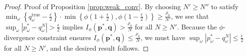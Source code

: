 \documentclass[opre,nonblindrev]{informs3} %
\newcommand{\q}{\mathbf{q}}
\newcommand{\p}{\mathbf{p}}
\newcommand{\qtrue}{\q^{\text{true}}}
\begin{document}
\begin{proof}{\sc Proof of Proposition \ref{prop:weak_conv}.}
	By choosing $N'\geq N''$ to satisfy $\min_{\omega} \left\{ q^{\text{true}}_\omega - \frac{\epsilon}{2} \right\} \cdot \min\left\{ \phi\left(1+\frac{\epsilon}{2}\right), \phi\left(1-\frac{\epsilon}{2}\right) \right\}\geq \frac{\rho_0}{N'}$, we see that $\sup_\omega |p_\omega^* - q^N_\omega| > \frac{\epsilon}{2}$ implies $I_\phi(\p^*,\q) > \frac{\rho_0}{N}$ for all $N \geq N'$. 
	Because the $\phi$-divergence constraint ensures $I_\phi(\p^*,\q) \leq \frac{\rho_0}{N}$, we must have $\sup_\omega |p_\omega^* - q^N_\omega| \leq \frac{\epsilon}{2}$ for all $N \geq N'$, and the desired result follows. 
%
%
%
%
%

\end{proof}
\end{document}

